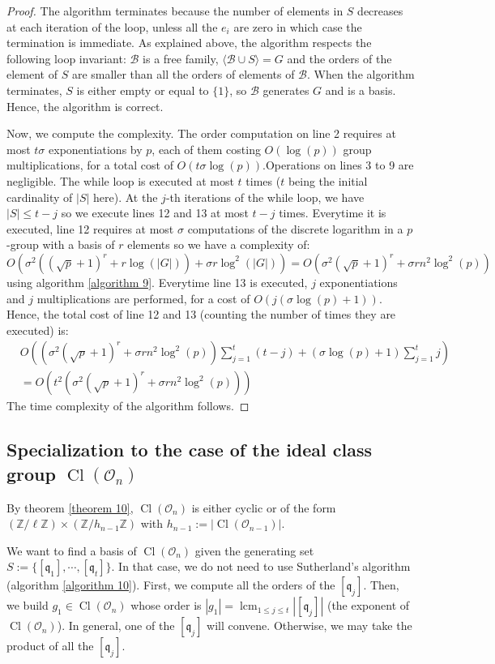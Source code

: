 \documentclass[a4paper,10pt]{report}
\theoremstyle{definition}
\theoremstyle{plain}
\theoremstyle{definition}
\newcommand{\Z}{\mathbb{Z}}
\newcommand{\m}[1]{\mathcal{#1}}
\newcommand{\mO}{\mathcal{O}}
\renewcommand{\(}{\left(}
\renewcommand{\)}{\right)}
\newcommand{\mf}[1]{\mathfrak{#1}}
\DeclareMathOperator{\Cl}{Cl}
\DeclareMathOperator{\lcm}{lcm}
\begin{document}
\begin{proof}
The algorithm terminates because the number of elements in $S$ decreases at each iteration of the loop, unless all the $e_i$ are zero in which case the termination is immediate.  As explained above, the algorithm respects the following loop invariant: $\m{B}$ is a free family, $\langle\m{B}\cup S\rangle=G$ and the orders of the element of $S$ are smaller than all the orders of elements of $\m{B}$.  When the algorithm terminates, $S$ is either empty or equal to $\{1\}$, so $\m{B}$ generates $G$ and is a basis. Hence, the algorithm is correct.

Now, we compute the complexity. The order computation on line 2 requires at most $t\sigma$ exponentiations by $p$, each of them costing $O(\log(p))$ group multiplications, for a total cost of $O(t\sigma\log(p))$.Operations on lines 3 to 9 are negligible. The while loop is executed at most $t$ times ($t$ being the initial cardinality of $|S|$ here). At the $j$-th iterations of the while loop, we have $|S|\leq t-j$ so we execute lines 12 and 13 at most $t-j$ times. Everytime it is executed, line 12 requires at most $\sigma$ computations of the discrete logarithm in a $p$-group with a basis of $r$ elements so we have a complexity of:
\[O(\sigma^2((\sqrt{p}+1)^r+r\log(|G|))+\sigma r\log^2(|G|))=O(\sigma^2(\sqrt{p}+1)^r+\sigma rn^2\log^2(p))\]
using algorithm \ref{algorithm 9}.  Everytime line 13 is executed, $j$ exponentiations and $j$ multiplications are performed, for a cost of $O(j(\sigma\log(p)+1))$. Hence, the total cost of line 12 and 13 (counting the number of times they are executed) is:
\begin{align*}&O\((\sigma^2(\sqrt{p}+1)^r+\sigma rn^2\log^2(p))\sum_{j=1}^t(t-j)+(\sigma\log(p)+1)\sum_{j=1}^t j\)\\
&=O(t^2(\sigma^2(\sqrt{p}+1)^r+\sigma rn^2\log^2(p)))
\end{align*}
The time complexity of the algorithm follows.
\end{proof}

\subsection{Specialization to the case of the ideal class group $\Cl(\mO_n)$}

By theorem \ref{theorem 10}, $\Cl(\mO_n)$ is either cyclic or of the form $(\Z/\ell\Z)\times(\Z/h_{n-1}\Z)$ with $h_{n-1}:=|\Cl(\mO_{n-1})|$. 

We want to find a basis of $\Cl(\mO_n)$ given the generating set $S:=\{[\mf{q}_1], \cdots, [\mf{q}_t]\}$. In that case, we do not need to use Sutherland's algorithm (algorithm \ref{algorithm 10}). First, we compute all the orders of the $[\mf{q}_j]$. Then, we build $g_1\in \Cl(\mO_n)$ whose order is $|g_1|=\lcm_{1\leq j\leq t}|[\mf{q}_j]|$ (the exponent of $\Cl(\mO_n)$). In general, one of the $[\mf{q}_j]$ will convene. Otherwise, we may take the product of all the $[\mf{q}_j]$. 
\end{document}
